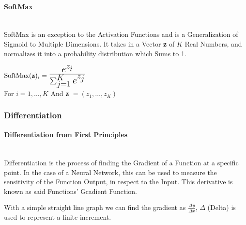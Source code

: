 \begin{flushleft}
                \paragraph{SoftMax} \mbox{} \\
                    SoftMax is an exception to the Activation Functions and is a Generalization of Sigmoid to Multiple Dimensions. It
                    takes in a Vector \textbf{z} of $K$ Real Numbers, and normalizes it into a probability distribution which Sums to 1. \\ 

                    \begin{center}
                        \begin{math}
                            \text{SoftMax}(\textbf{z})_{i} = \mathLarge{\frac{e^{z_{i}}}{\sum_{j=1}^{K} e^{z_{j}}}}
                        \end{math} \\
                        \vspace{0.2cm}
                        For $i = 1, \hdots,K$ And \textbf{z} $ = (z_{1},\hdots,z_{K})$ \\
                    \end{center}           
            \subsubsection{Differentiation}
                \paragraph{Differentiation from First Principles}  \mbox{} \\
                    \vspace{0.2cm}
                    Differentiation is the process of finding the Gradient of a Function at a specific point. In the case of a Neural Network,
                    this can be used to measure the sensitivity of the Function Output, in respect to the Input. This derivative is known as said 
                    Functions' Gradient Function. \\
                    \vspace{0.2cm}
                    
                    With a simple straight line graph we can find the gradient as {\Large$\frac{\Delta y}{\Delta x}$, $\Delta$} (Delta) is used to 
                    represent a finite increment. \\
                    \vspace{0.2cm}


\end{flushleft}
